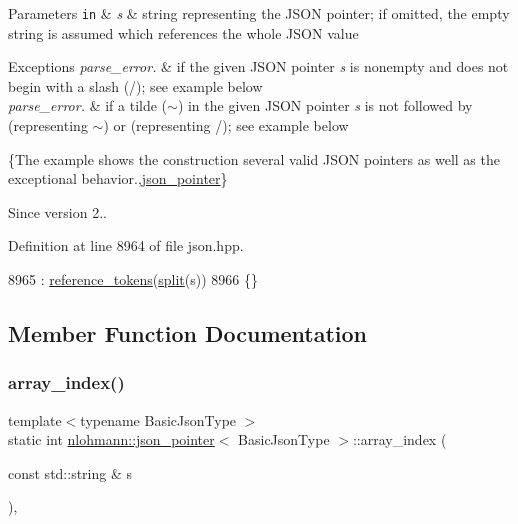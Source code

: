 \begin{DoxyParams}[1]{Parameters}
\mbox{\tt in}  & {\em s} & string representing the J\+S\+ON pointer; if omitted, the empty string is assumed which references the whole J\+S\+ON value\\
\hline
\end{DoxyParams}

\begin{DoxyExceptions}{Exceptions}
{\em parse\+\_\+error.} & if the given J\+S\+ON pointer {\itshape s} is nonempty and does not begin with a slash ({\ttfamily /}); see example below\\
\hline
{\em parse\+\_\+error.} & if a tilde ({\ttfamily $\sim$}) in the given J\+S\+ON pointer {\itshape s} is not followed by {} (representing {\ttfamily $\sim$}) or {} (representing {\ttfamily /}); see example below\\
\hline
\end{DoxyExceptions}
\{The example shows the construction several valid J\+S\+ON pointers as well as the exceptional behavior.,\hyperlink{classnlohmann_1_1json__pointer}{json\+\_\+pointer}\}

\begin{DoxySince}{Since}
version 2.. 
\end{DoxySince}


Definition at line 8964 of file json.\+hpp.


\begin{DoxyCode}
8965         : \hyperlink{classnlohmann_1_1json__pointer_a07a990a6838de4f38ee9d881e7b9fd61}{reference\_tokens}(\hyperlink{classnlohmann_1_1json__pointer_ae01c32c6a071c2e5198d5dfcce290e50}{split}(s))
8966     \{\}
\end{DoxyCode}


\subsection{Member Function Documentation}
\mbox{\label{classnlohmann_1_1json__pointer_ac53f5b79dd91da78743c437832f57ce4}} 
\subsubsection{\texorpdfstring{array\+\_\+index()}{array\_index()}}
{\footnotesize\ttfamily template$<$typename Basic\+Json\+Type $>$ \\
static int \hyperlink{classnlohmann_1_1json__pointer}{nlohmann\+::json\+\_\+pointer}$<$ Basic\+Json\+Type $>$\+::array\+\_\+index (\begin{DoxyParamCaption}\item[{const std\+::string \&}]{s }\end{DoxyParamCaption})\hspace{0.3cm}{\ttfamily [inline]}, {\ttfamily [static]}}


